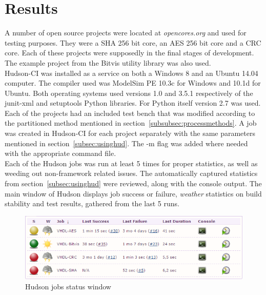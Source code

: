 \documentclass[11pt,british]{article}
\begin{document}
\section{Results}
A number of open source projects were located at \emph{opencores.org} and used for testing purposes. They were a \gls{SHA} 256 bit core, an \gls{AES} 256 bit core and a \gls{CRC} core. Each of these projects were supposedly in the final stages of development. The example project from the Bitvis utility library was also used.
\\[\baselineskip]
Hudson-CI was installed as a service on both a Windows 8 and an Ubuntu 14.04 computer. The compiler used was ModelSim PE 10.3c for Windows and 10.1d for Ubuntu. Both operating systems used versions 1.0 and 3.5.1 respectively of the junit-xml and setuptools Python libraries. For Python itself version 2.7 was used.
\\[\baselineskip]
Each of the projects had an included test bench that was modified according to the partitioned method mentioned in section~\ref{subsubsec:processmethods}. A job was created in Hudson-CI for each project separately with the same parameters mentioned in section~\ref{subsec:usinghud}. The -m flag was added where needed with the appropriate command file.
\\[\baselineskip]
Each of the Hudson jobs was run at least 5 times for proper statistics, as well as weeding out non-framework related issues. The automatically captured statistics from section~\ref{subsec:usinghud} were reviewed, along with the console output. The main window of Hudson displays job success or failure, \emph{weather} statistics on build stability and test results, gathered from the last 5 runs.

\begin{figure}[h]
    \centering
	\includegraphics[width=\textwidth]{images/jobs.png}
    \caption{Hudson jobs status window}
    \label{fig:hudsonjobs}
\end{figure}
\end{document}
